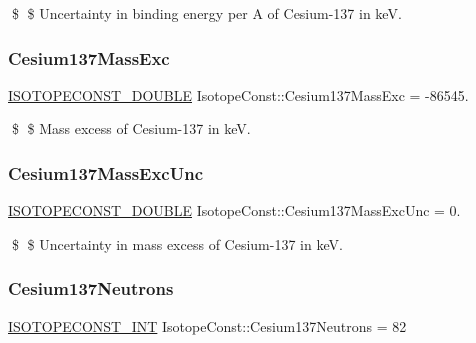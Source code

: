 \$ \$ Uncertainty in binding energy per A of Cesium-\/137 in keV. \mbox{\label{group___isotope_const-_cesium-_cs137_ga06e69f3943aa100a4caf3940e804d050}} 
\subsubsection{\texorpdfstring{Cesium137\+Mass\+Exc}{Cesium137MassExc}}
{\footnotesize\ttfamily \mbox{\hyperlink{group___isotope_const-_macros_ga8f45a7272ce02c0b4c65c44636ed719a}{I\+S\+O\+T\+O\+P\+E\+C\+O\+N\+S\+T\+\_\+\+D\+O\+U\+B\+LE}} Isotope\+Const\+::\+Cesium137\+Mass\+Exc = -\/86545.}

\$ \$ Mass excess of Cesium-\/137 in keV. \mbox{\label{group___isotope_const-_cesium-_cs137_gaf39ff51fbe6efaa5318994e228fe54f2}} 
\subsubsection{\texorpdfstring{Cesium137\+Mass\+Exc\+Unc}{Cesium137MassExcUnc}}
{\footnotesize\ttfamily \mbox{\hyperlink{group___isotope_const-_macros_ga8f45a7272ce02c0b4c65c44636ed719a}{I\+S\+O\+T\+O\+P\+E\+C\+O\+N\+S\+T\+\_\+\+D\+O\+U\+B\+LE}} Isotope\+Const\+::\+Cesium137\+Mass\+Exc\+Unc = 0.}

\$ \$ Uncertainty in mass excess of Cesium-\/137 in keV. \mbox{\label{group___isotope_const-_cesium-_cs137_ga5914fd08132410b13def09352e921f26}} 
\subsubsection{\texorpdfstring{Cesium137\+Neutrons}{Cesium137Neutrons}}
{\footnotesize\ttfamily \mbox{\hyperlink{group___isotope_const-_macros_ga5f18360b3e99483a35c32d789e62621c}{I\+S\+O\+T\+O\+P\+E\+C\+O\+N\+S\+T\+\_\+\+I\+NT}} Isotope\+Const\+::\+Cesium137\+Neutrons = 82}

